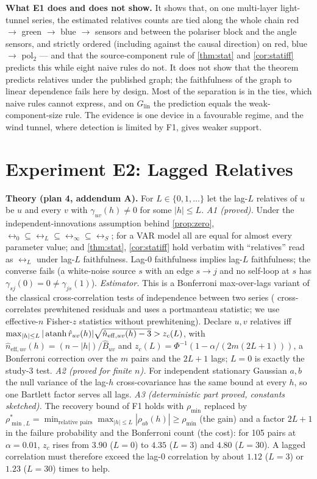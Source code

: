 \textbf{What E1 does and does not show.} It shows that, on one multi-layer light-tunnel series, the estimated relatives counts are tied along the whole chain red $\to$ green $\to$ blue $\to$ sensors and between the polariser block and the angle sensors, and strictly ordered (including against the causal direction) on red, blue $\to$ pol$_2$ --- and that the source-component rule of \cref{thm:stat} and \cref{cor:statiff} predicts this while eight naive rules do not. It does not show that the theorem predicts relatives under the published graph; the faithfulness of the graph to linear dependence fails here by design. Most of the separation is in the ties, which naive rules cannot express, and on $G_{\mathrm{lin}}$ the prediction equals the weak-component-size rule. The evidence is one device in a favourable regime, and the wind tunnel, where detection is limited by F1, gives weaker support.

\section{Experiment E2: Lagged Relatives}
\label{app:e2}

\textbf{Theory (plan 4, addendum A).} For $L\in\{0,1,\dots\}$ let the lag-$L$ relatives of $u$ be $u$ and every $v$ with $\gamma_{uv}(h)\neq0$ for some $|h|\le L$.
\emph{A1 (proved).} Under the independent-innovations assumption behind \cref{prop:zero}, $\rel_0\subseteq\rel_L\subseteq\rel_\infty\subseteq\rel_S$; for a VAR model all are equal for almost every parameter value;
and \cref{thm:stat}, \cref{cor:statiff} hold verbatim with ``relatives'' read as $\rel_L$ under lag-$L$ faithfulness. Lag-0 faithfulness implies lag-$L$ faithfulness; the converse fails
(a white-noise source $s$ with an edge $s\to j$ and no self-loop at $s$ has $\gamma_{sj}(0)=0\ne\gamma_{js}(1)$).
\emph{Estimator.} This is a Bonferroni max-over-lags variant of the classical
cross-correlation tests of independence between two series
(\citealp{haugh1976checking} cross-correlates prewhitened residuals and uses a
portmanteau statistic; we use effective-$n$ Fisher-$z$ statistics without
prewhitening). Declare $u,v$ relatives iff $\max_{|h|\le L}|\operatorname{atanh} \hat r_{uv}(h)|\sqrt{\hat n_{\mathrm{eff},uv}(h)-3}>z_c(L)$, with $\hat n_{\mathrm{eff},uv}(h)=(n-|h|)/\hat B_{uv}$ and
$z_c(L)=\Phi^{-1}(1-\alpha/(2m(2L+1)))$, a Bonferroni correction over the $m$ pairs and the $2L+1$ lags; $L=0$ is exactly the study-3 test.
\emph{A2 (proved for finite $n$).} For independent stationary Gaussian $a,b$ the null variance of the lag-$h$ cross-covariance has the same bound at every $h$, so one Bartlett factor serves all lags.
\emph{A3 (deterministic part proved, constants sketched).} The recovery bound of F1 holds with $\rho_{\min}$ replaced by $\rho^*_{\min,L}=\min_{\text{relative pairs}}\max_{|h|\le L}|\rho_{ab}(h)|\ge\rho_{\min}$ (the gain) and a factor $2L+1$ in the failure probability and the Bonferroni count (the cost):
for 105 pairs at $\alpha=0.01$, $z_c$ rises from $3.90$ ($L=0$) to $4.35$ ($L=3$) and $4.80$ ($L=30$). A lagged correlation must therefore exceed the lag-0 correlation by about $1.12$ ($L=3$) or $1.23$ ($L=30$) times to help.


